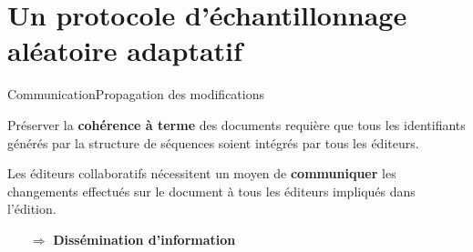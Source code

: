 \section{Un protocole d'échantillonnage aléatoire adaptatif}

\begin{frame}{Communication}{Propagation des modifications}

  Préserver la \textbf{cohérence à terme} des documents requière que tous les
  identifiants générés par la structure de séquences soient intégrés par tous
  les éditeurs.
  
  \vspace{0.5cm}
  
  Les éditeurs collaboratifs nécessitent un moyen de \textbf{communiquer} les
  changements effectués sur le document à tous les éditeurs impliqués dans
  l'édition.
  
  \vspace{0.5cm}

  \large
  \begin{itemize}
  \item [$\Rightarrow$] \textbf{Dissémination d'information}
  \end{itemize}
  \vspace{0.5cm}
\end{frame}


